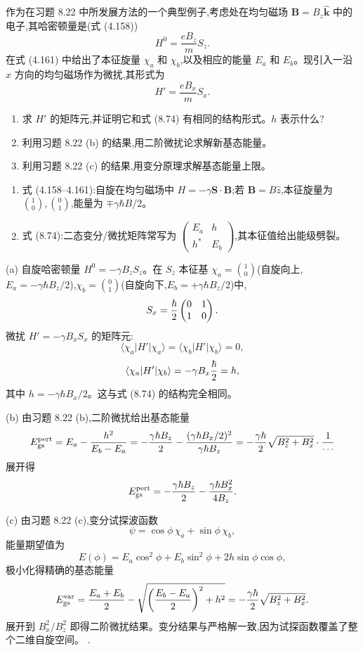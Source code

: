 \begin{question}
作为在习题 8.22 中所发展方法的一个典型例子,考虑处在均匀磁场 $\mathbf B=B_z\hat{\mathbf k}$ 中的电子,其哈密顿量是(式 (4.158))
\[
H^0=\frac{eB_z}{m}S_z.
\]
在式 (4.161) 中给出了本征旋量 $\chi_a$ 和 $\chi_b$,以及相应的能量 $E_a$ 和 $E_b$。现引入一沿 $x$ 方向的均匀磁场作为微扰,其形式为
\[
H'=\frac{eB_x}{m}S_x.
\]
\begin{enumerate}
\item 求 $H'$ 的矩阵元,并证明它和式 (8.74) 有相同的结构形式。$h$ 表示什么?
\item 利用习题 8.22 (b) 的结果,用二阶微扰论求解新基态能量。
\item 利用习题 8.22 (c) 的结果,用变分原理求解基态能量上限。
\end{enumerate}

\par\smallskip
{}
\begin{enumerate}[leftmargin=2.2em,itemsep=0.12em,topsep=0.12em,parsep=0pt]
\item 式 (4.158--4.161):自旋在均匀磁场中 $H=-\gamma\mathbf S\cdot\mathbf B$;若 $\mathbf B=B\hat z$,本征旋量为 $\binom10,\binom01$,能量为 $\mp\gamma\hbar B/2$。
\item 式 (8.74):二态变分/微扰矩阵常写为 $\begin{pmatrix}E_a&h\\h^*&E_b\end{pmatrix}$,其本征值给出能级劈裂。
\end{enumerate}

\end{question}
\begin{solution}
(a) 自旋哈密顿量 $H^0=-\gamma B_zS_z$。在 $S_z$ 本征基 $\chi_a=\binom10$(自旋向上,$E_a=-\gamma\hbar B_z/2$),$\chi_b=\binom01$(自旋向下,$E_b=+\gamma\hbar B_z/2$)中,
\[
S_x={\hbar\over2}\begin{pmatrix}0&1\\1&0\end{pmatrix}.
\]
微扰 $H'=-\gamma B_xS_x$ 的矩阵元:
\[
\langle\chi_a|H'|\chi_a\rangle=\langle\chi_b|H'|\chi_b\rangle=0,
\]
\[
\langle\chi_a|H'|\chi_b\rangle=-\gamma B_x{\hbar\over2}=h,
\]
其中 $h=-\gamma\hbar B_x/2$。这与式 (8.74) 的结构完全相同。

(b) 由习题 8.22 (b),二阶微扰给出基态能量
\[
E_{\rm gs}^{\rm pert}=E_a-{h^2\over E_b-E_a}
=-{\gamma\hbar B_z\over2}-{(\gamma\hbar B_x/2)^2\over\gamma\hbar B_z}
=-{\gamma\hbar\over2}\sqrt{B_z^2+B_x^2}\cdot{1\over\cdots}
\]
展开得
\[
E_{\rm gs}^{\rm pert}=-{\gamma\hbar B_z\over2}-{\gamma\hbar B_x^2\over4B_z}.
\]

(c) 由习题 8.22 (c),变分试探波函数
\[
\psi=\cos\phi\,\chi_a+\sin\phi\,\chi_b,
\]
能量期望值为
\[
E(\phi)=E_a\cos^2\phi+E_b\sin^2\phi+2h\sin\phi\cos\phi,
\]
极小化得精确的基态能量
\[
E_{\rm gs}^{\rm var}={E_a+E_b\over2}-\sqrt{\left({E_b-E_a\over2}\right)^2+h^2}
=-{\gamma\hbar\over2}\sqrt{B_z^2+B_x^2}.
\]
展开到 $B_x^2/B_z^2$ 即得二阶微扰结果。变分结果与严格解一致,因为试探函数覆盖了整个二维自旋空间。
.
\end{solution}

